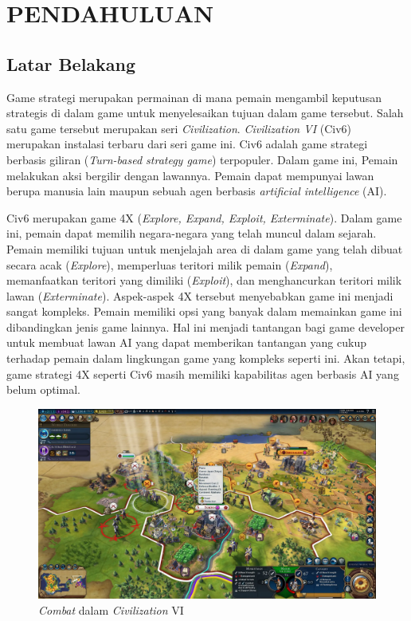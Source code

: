 \chapter{PENDAHULUAN}
\label{chap:pendahuluan}


\section{Latar Belakang}
\label{sec:latarbelakang}

Game strategi merupakan permainan di mana pemain mengambil keputusan strategis di dalam game untuk menyelesaikan tujuan dalam game tersebut. Salah satu game tersebut merupakan seri \emph{Civilization}. 
\emph{Civilization VI} (Civ6) merupakan instalasi terbaru dari seri game ini. Civ6 adalah game strategi berbasis giliran (\emph{Turn-based strategy game}) terpopuler. 
Dalam game ini, Pemain melakukan aksi bergilir dengan lawannya. Pemain dapat mempunyai lawan berupa manusia lain maupun sebuah agen berbasis \emph{artificial intelligence} (AI).

Civ6 merupakan game 4X (\emph{Explore, Expand, Exploit, Exterminate}). Dalam game ini, pemain dapat memilih negara-negara yang telah muncul dalam sejarah. 
Pemain memiliki tujuan untuk menjelajah area di dalam game yang telah dibuat secara acak (\emph{Explore}), memperluas teritori milik pemain (\emph{Expand}), memanfaatkan teritori yang dimiliki (\emph{Exploit}), dan menghancurkan teritori milik lawan (\emph{Exterminate}). 
Aspek-aspek 4X tersebut menyebabkan game ini menjadi sangat kompleks. Pemain memiliki opsi yang banyak dalam memainkan game ini dibandingkan jenis game lainnya.
Hal ini menjadi tantangan bagi game developer untuk membuat lawan AI yang dapat memberikan tantangan yang cukup terhadap pemain dalam lingkungan game yang kompleks seperti ini. 
Akan tetapi, game strategi 4X seperti Civ6 masih memiliki kapabilitas agen berbasis AI yang belum optimal. 

\begin{figure}[H]
    \centering
      \includegraphics[scale=0.2]{gambar/civ6_screenshot.png}
      \caption{\emph{Combat} dalam \emph{Civilization} VI}
      \label{fig:civ6_combat_image}
  \end{figure}

